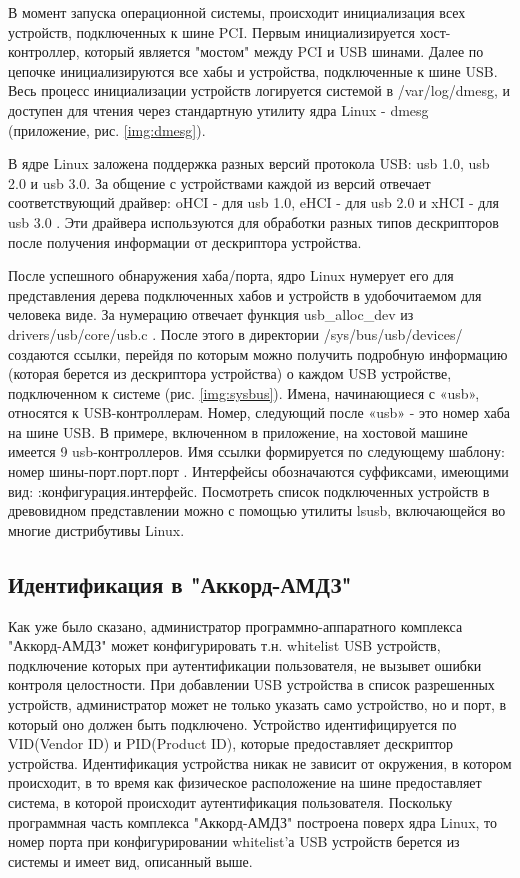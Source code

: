 \par
В момент запуска операционной системы, происходит инициализация всех устройств, подключенных к шине PCI. Первым инициализируется хост-контроллер,
который является "мостом" между PCI и USB шинами. Далее по цепочке инициализируются все хабы и устройства, подключенные к шине USB.
Весь процесс инициализации устройств логируется системой в /var/log/dmesg,
и доступен для чтения через стандартную утилиту ядра Linux - dmesg (приложение, рис. \ref{img:dmesg}).
\par
В ядре Linux заложена поддержка разных версий протокола USB: usb 1.0, usb 2.0 и usb 3.0. За общение с устройствами каждой из версий
отвечает соответствующий драйвер: oHCI - для usb 1.0, eHCI - для usb 2.0 и xHCI - для usb 3.0 \cite {kernel_echi}. Эти драйвера
используются для обработки разных типов дескрипторов после получения информации от дескриптора устройства.
\par
После успешного обнаружения хаба/порта, ядро Linux нумерует его для представления дерева подключенных
хабов и устройств в удобочитаемом для человека виде. За нумерацию отвечает функция usb\_alloc\_dev из drivers/usb/core/usb.c \cite{enumeration}.
После этого в директории /sys/bus/usb/devices/ создаются ссылки, перейдя по которым можно получить подробную информацию (которая
берется из дескриптора устройства) о каждом USB устройстве, подключенном к системе (рис. \ref{img:sysbus}).
Имена, начинающиеся с «usb», относятся к USB-контроллерам. Номер, следующий после «usb» - это номер хаба на шине USB.
В примере, включенном в приложение, на хостовой машине имеется 9 usb-контроллеров.
Имя ссылки формируется по следующему шаблону: номер шины-порт.порт.порт \cite{linux_usb}.
Интерфейсы обозначаются суффиксами, имеющими вид: :конфигурация.интерфейс.
Посмотреть список подключенных устройств в древовидном представлении можно с помощью утилиты lsusb, включающейся во многие
дистрибутивы Linux.
\clearpage
\subsection{Идентификация в "Аккорд-АМДЗ"}
Как уже было сказано, администратор программно-аппаратного комплекса "Аккорд-АМДЗ" может конфигурировать т.н. whitelist USB устройств,
подключение которых при аутентификации пользователя, не вызывет ошибки контроля целостности. При добавлении USB устройства в список разрешенных
устройств, администратор может не только указать само устройство, но и порт, в который оно должен быть подключено. Устройство идентифицируется
по VID(Vendor ID) и PID(Product ID), которые предоставляет дескриптор устройства. Идентификация устройства никак не зависит от окружения,
в котором происходит, в то время как физическое расположение на шине предоставляет система, в которой происходит аутентификация пользователя.
Поскольку программная часть комплекса "Аккорд-АМДЗ" построена поверх ядра Linux, то номер порта при конфигурировании whitelist'а
USB устройств берется из системы и имеет вид, описанный выше.

